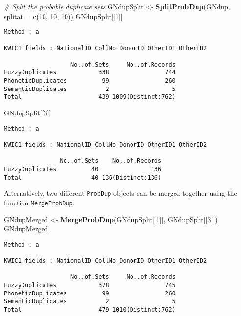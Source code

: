 \documentclass[]{article}
\newenvironment{Shaded}{\begin{snugshade}}{\end{snugshade}}
\newcommand{\CommentTok}[1]{\textcolor[rgb]{0.56,0.35,0.01}{\textit{#1}}}
\newcommand{\DataTypeTok}[1]{\textcolor[rgb]{0.13,0.29,0.53}{#1}}
\newcommand{\DecValTok}[1]{\textcolor[rgb]{0.00,0.00,0.81}{#1}}
\newcommand{\KeywordTok}[1]{\textcolor[rgb]{0.13,0.29,0.53}{\textbf{#1}}}
\newcommand{\NormalTok}[1]{#1}
\newcommand{\StringTok}[1]{\textcolor[rgb]{0.31,0.60,0.02}{#1}}
\begin{document}
\begin{Shaded}
\begin{Highlighting}[]
\CommentTok{# Split the probable duplicate sets}
\NormalTok{GNdupSplit <-}\StringTok{ }\KeywordTok{SplitProbDup}\NormalTok{(GNdup, }\DataTypeTok{splitat =} \KeywordTok{c}\NormalTok{(}\DecValTok{10}\NormalTok{, }\DecValTok{10}\NormalTok{, }\DecValTok{10}\NormalTok{))}
\NormalTok{GNdupSplit[[}\DecValTok{1}\NormalTok{]]}
\end{Highlighting}
\end{Shaded}

\begin{verbatim}
Method : a

KWIC1 fields : NationalID CollNo DonorID OtherID1 OtherID2
 
                   No..of.Sets     No..of.Records
FuzzyDuplicates            338                744
PhoneticDuplicates          99                260
SemanticDuplicates           2                  5
Total                      439 1009(Distinct:762)
\end{verbatim}

\begin{Shaded}
\begin{Highlighting}[]
\NormalTok{GNdupSplit[[}\DecValTok{3}\NormalTok{]]}
\end{Highlighting}
\end{Shaded}

\begin{verbatim}
Method : a

KWIC1 fields : NationalID CollNo DonorID OtherID1 OtherID2
 
                No..of.Sets    No..of.Records
FuzzyDuplicates          40               136
Total                    40 136(Distinct:136)
\end{verbatim}

Alternatively, two different \texttt{ProbDup} objects can be merged
together using the function \texttt{MergeProbDup}.

\begin{Shaded}
\begin{Highlighting}[]
\NormalTok{GNdupMerged <-}\StringTok{ }\KeywordTok{MergeProbDup}\NormalTok{(GNdupSplit[[}\DecValTok{1}\NormalTok{]], GNdupSplit[[}\DecValTok{3}\NormalTok{]])}
\NormalTok{GNdupMerged}
\end{Highlighting}
\end{Shaded}

\begin{verbatim}
Method : a

KWIC1 fields : NationalID CollNo DonorID OtherID1 OtherID2
 
                   No..of.Sets     No..of.Records
FuzzyDuplicates            378                745
PhoneticDuplicates          99                260
SemanticDuplicates           2                  5
Total                      479 1010(Distinct:762)
\end{verbatim}
\end{document}
